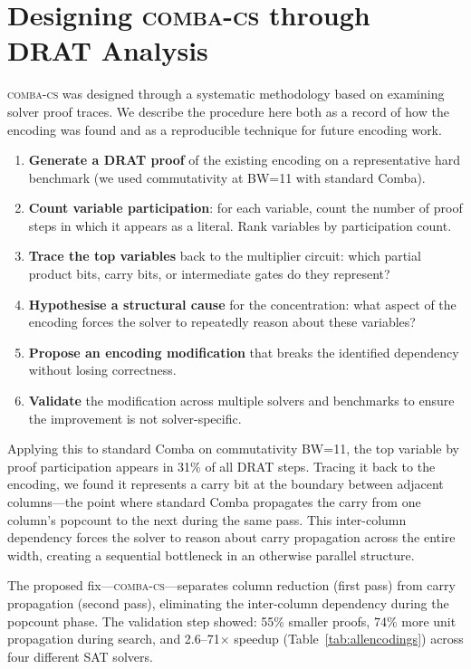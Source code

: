 \documentclass[a4paper]{ceurart}
\newcommand{\combacs}{\textsc{comba-cs}\xspace}
\begin{document}
\section{Designing \combacs through DRAT Analysis}
\label{sec:methodology}

\combacs was designed through a systematic methodology based on
examining solver proof traces. We describe the procedure here both
as a record of how the encoding was found and as a reproducible
technique for future encoding work.

\begin{enumerate}
\item \textbf{Generate a DRAT proof} of the existing encoding on a
  representative hard benchmark (we used commutativity at BW=11
  with standard Comba).
\item \textbf{Count variable participation}: for each variable,
  count the number of proof steps in which it appears as a
  literal. Rank variables by participation count.
\item \textbf{Trace the top variables} back to the multiplier
  circuit: which partial product bits, carry bits, or intermediate
  gates do they represent?
\item \textbf{Hypothesise a structural cause} for the
  concentration: what aspect of the encoding forces the solver to
  repeatedly reason about these variables?
\item \textbf{Propose an encoding modification} that breaks the
  identified dependency without losing correctness.
\item \textbf{Validate} the modification across multiple solvers
  and benchmarks to ensure the improvement is not solver-specific.
\end{enumerate}

Applying this to standard Comba on commutativity BW=11, the top
variable by proof participation appears in 31\% of all DRAT
steps. Tracing it back to the encoding, we found it represents a
carry bit at the boundary between adjacent columns---the point
where standard Comba propagates the carry from one column's
popcount to the next during the same pass. This inter-column
dependency forces the solver to reason about carry propagation
across the entire width, creating a sequential bottleneck in an
otherwise parallel structure.

The proposed fix---\combacs---separates column reduction (first
pass) from carry propagation (second pass), eliminating the
inter-column dependency during the popcount phase. The validation
step showed: 55\% smaller proofs, 74\% more unit propagation
during search, and 2.6--71$\times$ speedup (Table~\ref{tab:allencodings})
across four different SAT solvers.
\end{document}
